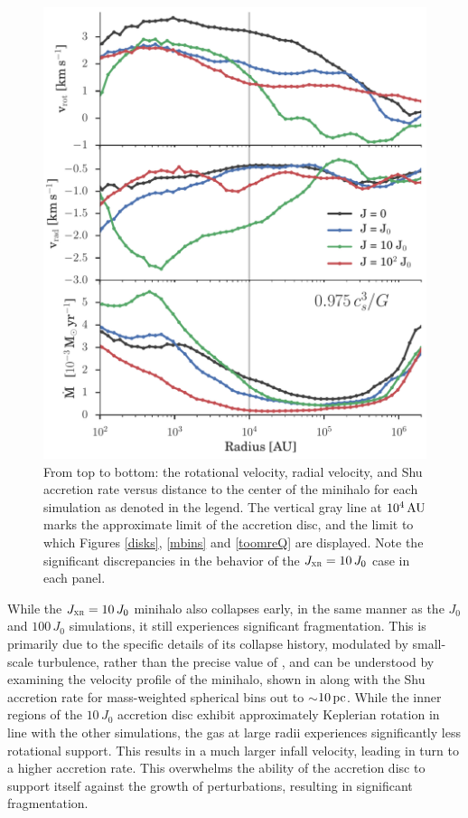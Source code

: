 \documentclass[../thesis.tex]{subfiles}
\begin{document}
\begin{figure}
  \begin{center}
    \includegraphics[width=\columnwidth]{figures/radial_bins/core_profile}
    \caption{From top to bottom: the rotational velocity, radial velocity, and Shu accretion rate versus distance to the center of the minihalo for each simulation as denoted in the legend.  The vertical gray line at $10^4\,\mathrm{AU}$ marks the approximate limit of the accretion disc, and the limit to which Figures \ref{disks}, \ref{mbins} and \ref{toomreQ} are displayed.  Note the significant discrepancies in the behavior of the $J_{\textsc{xr}}=10\,J_0$ case in each panel.}
    \label{core_profile}
  \end{center}
\end{figure}
While the $J_{\textsc{xr}}=10\,J_0$ minihalo also collapses early, in the same manner as the $J_0$ and $100\,J_0$ simulations, it still experiences significant fragmentation.  This is primarily due to the specific details of its collapse history, modulated by small-scale turbulence, rather than the precise value of \jxr, and can be understood by examining the velocity profile of the minihalo, shown in  along with the Shu accretion rate \citep{Shu1977} for mass-weighted spherical bins out to $\sim$$10\,\mathrm{pc}$. While the inner regions of the $10\,J_0$ accretion disc exhibit approximately Keplerian rotation in line with the other simulations, the gas at large radii experiences significantly less rotational support.  This results in a much larger infall velocity, leading in turn to a higher accretion rate.  This overwhelms the ability of the accretion disc to support itself against the growth of perturbations, resulting in significant fragmentation.
\end{document}
